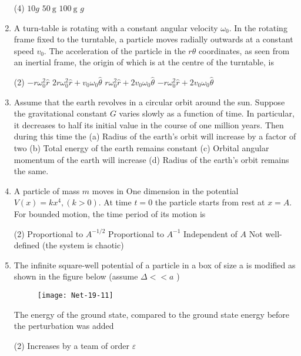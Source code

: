 \begin{enumerate}
 \begin{tasks}(4)
	\task[\textbf{a.}]$10 g$
	\task[\textbf{b.}] $50 \mathrm{~g}$
	\task[\textbf{c.}] $100 \mathrm{~g}$
	\task[\textbf{d.}]  $g$
\end{tasks}
\item  A turn-table is rotating with a constant angular velocity $\omega_{0}$. In the rotating frame fixed to the turntable, a particle moves radially outwards at a constant speed $v_{0}$. The acceleration of the particle in the $r \theta$ coordinates, as seen from an inertial frame, the origin of which is at the centre of the turntable, is
 \begin{tasks}(2)
	\task[\textbf{a.}]$-r \omega_{0}^{2} \hat{r}$
	\task[\textbf{b.}]$2 r \omega_{0}^{2} \hat{r}+v_{0} \omega_{0} \hat{\theta}$
	\task[\textbf{c.}]$r \omega_{0}^{2} \hat{r}+2 v_{0} \omega_{0} \hat{\theta}$
	\task[\textbf{d.}] $-r \omega_{0}^{2} \hat{r}+2 v_{0} \omega_{0} \hat{\theta}$
\end{tasks}
\item  Assume that the earth revolves in a circular orbit around the sun. Suppose the gravitational constant $G$ varies slowly as a function of time. In particular, it decreases to half its initial value in the course of one million years. Then during this time the
(a) Radius of the earth's orbit will increase by a factor of two
(b) Total energy of the earth remains constant
(c) Orbital angular momentum of the earth will increase
(d) Radius of the earth's orbit remains the same.
\item  A particle of mass $m$ moves in One dimension in the potential $V(x)=k x^{4},(k>0)$. At time $t=0$ the particle starts from rest at $x=A$.
For bounded motion, the time period of its motion is
 \begin{tasks}(2)
	\task[\textbf{a.}]Proportional to $A^{-1 / 2}$
	\task[\textbf{b.}]Proportional to $A^{-1}$
	\task[\textbf{c.}] Independent of $A$
	\task[\textbf{d.}]  Not well-defined (the system is chaotic)
\end{tasks}
\item  The infinite square-well potential of a particle in a box of size a is modified as shown in the figure below (assume $\Delta<<a$ )
\begin{figure}[H]
	\centering
	\texttt{[image: Net-19-11]}
\end{figure}
The energy of the ground state, compared to the ground state energy before the perturbation was added
 \begin{tasks}(2)
	\task[\textbf{a.}]Increases by a team of order $\varepsilon$

\end{tasks}
\end{enumerate}
